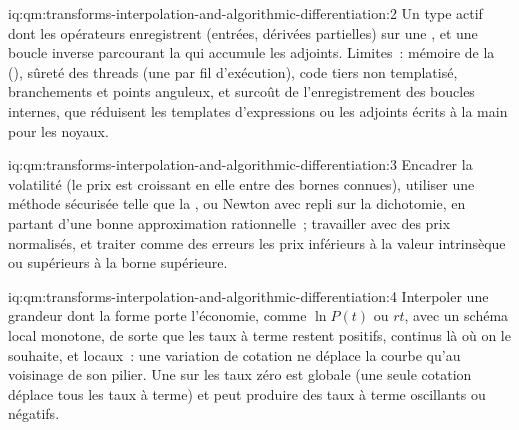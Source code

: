 \begin{solution}{iq:qm:transforms-interpolation-and-algorithmic-differentiation:2}
Un type actif dont les opérateurs enregistrent (entrées, dérivées partielles) sur une , et une boucle inverse parcourant la  qui accumule les adjoints. Limites~: mémoire de la  (), sûreté des threads (une  par
fil d'exécution), code tiers non templatisé, branchements et points anguleux, et surcoût de l'enregistrement des boucles internes, que réduisent les templates d'expressions ou les adjoints écrits à la main pour les noyaux.
\end{solution}

\begin{solution}{iq:qm:transforms-interpolation-and-algorithmic-differentiation:3}
Encadrer la volatilité (le prix est croissant en elle entre des bornes connues), utiliser une méthode sécurisée telle que la , ou Newton avec repli sur la dichotomie, en partant d'une bonne
approximation rationnelle~; travailler avec des prix normalisés, et traiter comme des erreurs les prix inférieurs à la valeur intrinsèque ou supérieurs à la borne supérieure.
\end{solution}

\begin{solution}{iq:qm:transforms-interpolation-and-algorithmic-differentiation:4}
Interpoler une grandeur dont la forme porte l'économie, comme $\ln P(t)$ ou $rt$, avec un schéma local monotone, de sorte que les taux à terme restent positifs, continus là où on le souhaite, et locaux~: une variation de cotation
ne déplace la courbe qu'au voisinage de son pilier. Une  sur les taux zéro est globale (une seule cotation déplace tous les taux à terme) et peut produire des taux à terme oscillants ou négatifs.
\end{solution}

